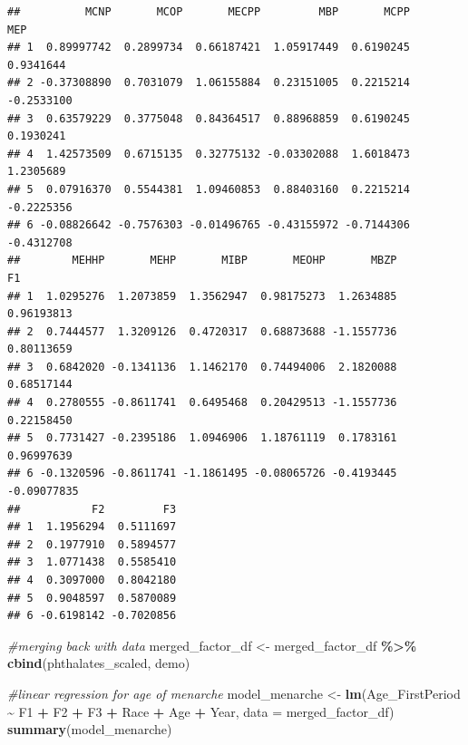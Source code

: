 \documentclass[
]{article}
\newenvironment{Shaded}{\begin{snugshade}}{\end{snugshade}}
\newcommand{\AttributeTok}[1]{\textcolor[rgb]{0.13,0.29,0.53}{#1}}
\newcommand{\CommentTok}[1]{\textcolor[rgb]{0.56,0.35,0.01}{\textit{#1}}}
\newcommand{\FunctionTok}[1]{\textcolor[rgb]{0.13,0.29,0.53}{\textbf{#1}}}
\newcommand{\NormalTok}[1]{#1}
\newcommand{\OtherTok}[1]{\textcolor[rgb]{0.56,0.35,0.01}{#1}}
\newcommand{\SpecialCharTok}[1]{\textcolor[rgb]{0.81,0.36,0.00}{\textbf{#1}}}
\begin{document}
\begin{verbatim}
##          MCNP       MCOP       MECPP         MBP       MCPP        MEP
## 1  0.89997742  0.2899734  0.66187421  1.05917449  0.6190245  0.9341644
## 2 -0.37308890  0.7031079  1.06155884  0.23151005  0.2215214 -0.2533100
## 3  0.63579229  0.3775048  0.84364517  0.88968859  0.6190245  0.1930241
## 4  1.42573509  0.6715135  0.32775132 -0.03302088  1.6018473  1.2305689
## 5  0.07916370  0.5544381  1.09460853  0.88403160  0.2215214 -0.2225356
## 6 -0.08826642 -0.7576303 -0.01496765 -0.43155972 -0.7144306 -0.4312708
##        MEHHP       MEHP       MIBP       MEOHP       MBZP          F1
## 1  1.0295276  1.2073859  1.3562947  0.98175273  1.2634885  0.96193813
## 2  0.7444577  1.3209126  0.4720317  0.68873688 -1.1557736  0.80113659
## 3  0.6842020 -0.1341136  1.1462170  0.74494006  2.1820088  0.68517144
## 4  0.2780555 -0.8611741  0.6495468  0.20429513 -1.1557736  0.22158450
## 5  0.7731427 -0.2395186  1.0946906  1.18761119  0.1783161  0.96997639
## 6 -0.1320596 -0.8611741 -1.1861495 -0.08065726 -0.4193445 -0.09077835
##           F2         F3
## 1  1.1956294  0.5111697
## 2  0.1977910  0.5894577
## 3  1.0771438  0.5585410
## 4  0.3097000  0.8042180
## 5  0.9048597  0.5870089
## 6 -0.6198142 -0.7020856
\end{verbatim}

\begin{Shaded}
\begin{Highlighting}[]
\CommentTok{\#merging back with data}
\NormalTok{merged\_factor\_df }\OtherTok{\textless{}{-}}\NormalTok{ merged\_factor\_df }\SpecialCharTok{\%\textgreater{}\%}
  \FunctionTok{cbind}\NormalTok{(phthalates\_scaled, demo)}

\CommentTok{\#linear regression for age of menarche}
\NormalTok{model\_menarche }\OtherTok{\textless{}{-}} \FunctionTok{lm}\NormalTok{(Age\_FirstPeriod }\SpecialCharTok{\textasciitilde{}}\NormalTok{ F1 }\SpecialCharTok{+}\NormalTok{ F2 }\SpecialCharTok{+}\NormalTok{ F3 }\SpecialCharTok{+}\NormalTok{ Race }\SpecialCharTok{+}\NormalTok{ Age }\SpecialCharTok{+}\NormalTok{ Year, }\AttributeTok{data =}\NormalTok{ merged\_factor\_df)}
\FunctionTok{summary}\NormalTok{(model\_menarche)}
\end{Highlighting}
\end{Shaded}
\end{document}
